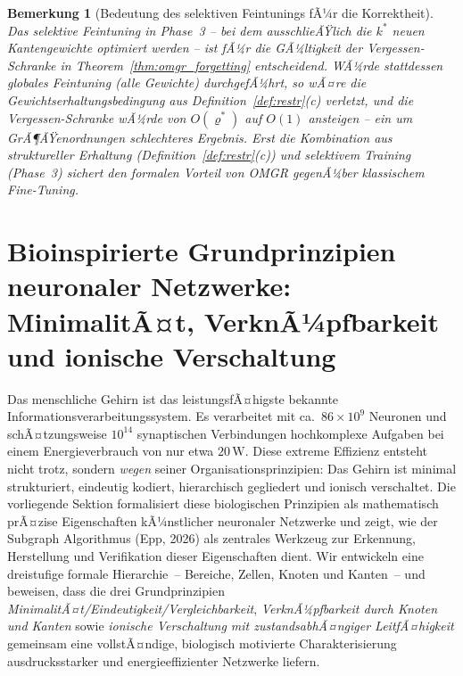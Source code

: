 ﻿\documentclass[12pt, a4paper, openany]{report}
\newtheorem{remark}[theorem]{Bemerkung}
\begin{document}
\begin{remark}[Bedeutung des selektiven Feintunings fÃ¼r die Korrektheit]
\label{rem:selective_finetuning}
Das selektive Feintuning in Phase~3 -- bei dem ausschlieÃŸlich die $k^*$
neuen Kantengewichte optimiert werden -- ist fÃ¼r die GÃ¼ltigkeit der
Vergessen-Schranke in Theorem~\ref{thm:omgr_forgetting} \emph{entscheidend}.
WÃ¼rde stattdessen globales Feintuning (alle Gewichte) durchgefÃ¼hrt,
so wÃ¤re die Gewichtserhaltungsbedingung aus Definition~\ref{def:restr}(c)
verletzt, und die Vergessen-Schranke wÃ¼rde von $O(\varrho^*)$ auf $O(1)$
ansteigen -- ein um GrÃ¶ÃŸenordnungen schlechteres Ergebnis.  Erst die
Kombination aus struktureller Erhaltung (Definition~\ref{def:restr}(c))
und selektivem Training (Phase~3) sichert den formalen Vorteil von OMGR
gegenÃ¼ber klassischem Fine-Tuning.
\end{remark}

\chapter{Bioinspirierte Grundprinzipien neuronaler Netzwerke: MinimalitÃ¤t, VerknÃ¼pfbarkeit und ionische Verschaltung}
\label{sec:bioprinciples}

Das menschliche Gehirn ist das leistungsfÃ¤higste bekannte Informationsverarbeitungssystem.
Es verarbeitet mit ca.\ $86 \times 10^9$ Neuronen und schÃ¤tzungsweise $10^{14}$
synaptischen Verbindungen hochkomplexe Aufgaben bei einem Energieverbrauch von
nur etwa $20\,\mathrm{W}$.  Diese extreme Effizienz entsteht nicht trotz,
sondern \emph{wegen} seiner Organisationsprinzipien: Das Gehirn ist minimal
strukturiert, eindeutig kodiert, hierarchisch gegliedert und ionisch
verschaltet.  Die vorliegende Sektion formalisiert diese biologischen
Prinzipien als mathematisch prÃ¤zise Eigenschaften kÃ¼nstlicher neuronaler
Netzwerke und zeigt, wie der Subgraph Algorithmus (Epp, 2026) als zentrales
Werkzeug zur Erkennung, Herstellung und Verifikation dieser Eigenschaften
dient.  Wir entwickeln eine dreistufige formale Hierarchie~-- Bereiche,
Zellen, Knoten und Kanten~-- und beweisen, dass die drei Grundprinzipien
\emph{MinimalitÃ¤t/Eindeutigkeit/Vergleichbarkeit},
\emph{VerknÃ¼pfbarkeit durch Knoten und Kanten} sowie
\emph{ionische Verschaltung mit zustandsabhÃ¤ngiger LeitfÃ¤higkeit}
gemeinsam eine vollstÃ¤ndige, biologisch motivierte Charakterisierung
ausdrucksstarker und energieeffizienter Netzwerke liefern.
\end{document}
